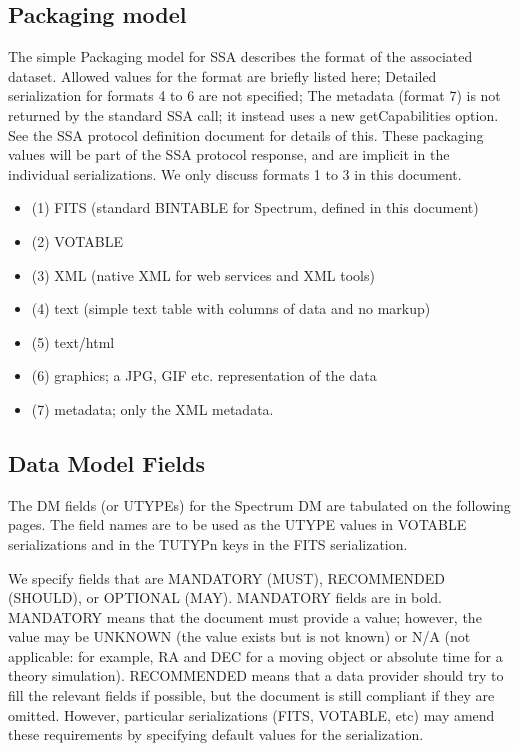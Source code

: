 \documentclass[11pt]{article}
\begin{document}
\subsection{Packaging model}

The simple Packaging model for SSA 
describes the format of the associated dataset.
Allowed values for the format are briefly listed here;
Detailed serialization for
formats 4 to 6 are not specified;
The metadata (format 7)
is not returned by the standard SSA call; it instead uses a new getCapabilities option. 
See the SSA protocol definition document for details of this.
These packaging values will be part of the SSA protocol response,
and are implicit in the individual serializations. We only discuss formats 1 to 3
in this document.



\colorbox{ipink}{
\begin{minipage}{0.9\textwidth}
\begin{itemize}
\item (1) FITS (standard BINTABLE for Spectrum, defined in this document)
\item (2) VOTABLE  
\item (3) XML  (native XML for web services and XML tools)
\item (4) text  (simple text table with columns of data and no markup)
\item (5) text/html
\item (6) graphics; a JPG, GIF etc. representation of the data
\item (7) metadata; only the XML metadata.

\end{itemize}
\end{minipage}
}

\subsection{Data Model Fields}

The DM fields (or UTYPEs) for the Spectrum DM are tabulated on the following 
pages. The field names are to be used as the UTYPE values in VOTABLE serializations
and in the TUTYPn keys in the FITS serialization.

We specify fields that are MANDATORY (MUST), RECOMMENDED (SHOULD), or
OPTIONAL (MAY).
MANDATORY fields are
in bold. MANDATORY means that the document must provide a value; however,
the value may be UNKNOWN (the value exists but is not known) or N/A
(not applicable: for example, RA and DEC for a moving object or
absolute time for a theory simulation). RECOMMENDED means that
a data provider should try to fill the relevant fields if possible,
but the document is still compliant if they are omitted.
However, particular serializations (FITS, VOTABLE, etc) may 
amend these requirements by specifying default values for the
serialization.
\end{document}
